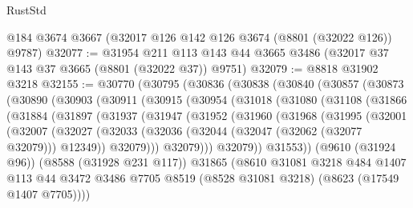 \begin{lexlean}{RustStd}
\begin{coremodule}
    @184
    @3674
    @3667
    (@32017 @126 @142 @126 @3674 (@8801 (@32022 @126)) @9787)
@32077 := @31954
    @211
    @113
    @143
    @44
    @3665
    @3486
    (@32017 @37 @143 @37 @3665 (@8801 (@32022 @37)) @9751)
@32079 := @8818 @31902 @3218
@32155 := @30770
    (@30795
      (@30836
        (@30838
          (@30840
            (@30857
              (@30873
                (@30890
                  (@30903
                    (@30911
                      (@30915
                        (@30954
                          (@31018
                            (@31080
                              (@31108
                                (@31866
                                  (@31884
                                    (@31897
                                      (@31937
                                        (@31947
                                          (@31952
                                            (@31960
                                              (@31968
                                                (@31995
                                                  (@32001
                                                    (@32007
                                                      (@32027
                                                        (@32033
                                                          (@32036
                                                            (@32044
                                                              (@32047 (@32062 (@32077 @32079)))
                                                              @12349))
                                                          @32079)))
                                                    @32079)))
                                              @32079))
                                          @31553))
                                      (@9610 (@31924 @96))
                                      (@8588 (@31928 @231 @117))
                                      @31865
                                      (@8610
                                        @31081
                                        @3218
                                        @484
                                        @1407
                                        @113
                                        @44
                                        @3472
                                        @3486
                                        @7705
                                        @8519
                                        (@8528 @31081 @3218)
                                        (@8623 (@17549 @1407 @7705))))

\end{coremodule}
\end{lexlean}
